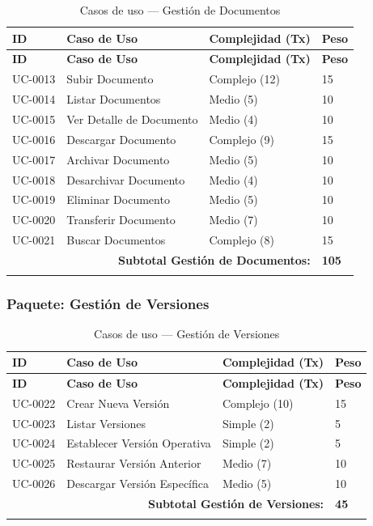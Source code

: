 \documentclass[11pt, a4paper]{article}
\begin{document}
\begin{longtable}{|p{1.8cm}|p{6.5cm}|p{3cm}|p{1.5cm}|}
\hline
\textbf{ID} & \textbf{Caso de Uso} & \textbf{Complejidad (Tx)} & \textbf{Peso} \\
\hline
\endfirsthead
\hline
\textbf{ID} & \textbf{Caso de Uso} & \textbf{Complejidad (Tx)} & \textbf{Peso} \\
\hline
\endhead
UC-0013 & Subir Documento & Complejo (12) & 15 \\
\hline
UC-0014 & Listar Documentos & Medio (5) & 10 \\
\hline
UC-0015 & Ver Detalle de Documento & Medio (4) & 10 \\
\hline
UC-0016 & Descargar Documento & Complejo (9) & 15 \\
\hline
UC-0017 & Archivar Documento & Medio (5) & 10 \\
\hline
UC-0018 & Desarchivar Documento & Medio (4) & 10 \\
\hline
UC-0019 & Eliminar Documento & Medio (5) & 10 \\
\hline
UC-0020 & Transferir Documento & Medio (7) & 10 \\
\hline
UC-0021 & Buscar Documentos & Complejo (8) & 15 \\
\hline
\multicolumn{3}{|r|}{\textbf{Subtotal Gestión de Documentos:}} & \textbf{105} \\
\hline
\caption{Casos de uso --- Gestión de Documentos}\label{tab:uc-documentos}
\end{longtable}

\subsubsection*{Paquete: Gestión de Versiones}

\begin{longtable}{|p{1.8cm}|p{6.5cm}|p{3cm}|p{1.5cm}|}
\hline
\textbf{ID} & \textbf{Caso de Uso} & \textbf{Complejidad (Tx)} & \textbf{Peso} \\
\hline
\endfirsthead
\hline
\textbf{ID} & \textbf{Caso de Uso} & \textbf{Complejidad (Tx)} & \textbf{Peso} \\
\hline
\endhead
UC-0022 & Crear Nueva Versión & Complejo (10) & 15 \\
\hline
UC-0023 & Listar Versiones & Simple (2) & 5 \\
\hline
UC-0024 & Establecer Versión Operativa & Simple (2) & 5 \\
\hline
UC-0025 & Restaurar Versión Anterior & Medio (7) & 10 \\
\hline
UC-0026 & Descargar Versión Específica & Medio (5) & 10 \\
\hline
\multicolumn{3}{|r|}{\textbf{Subtotal Gestión de Versiones:}} & \textbf{45} \\
\hline
\caption{Casos de uso --- Gestión de Versiones}\label{tab:uc-versiones}
\end{longtable}
\end{document}
